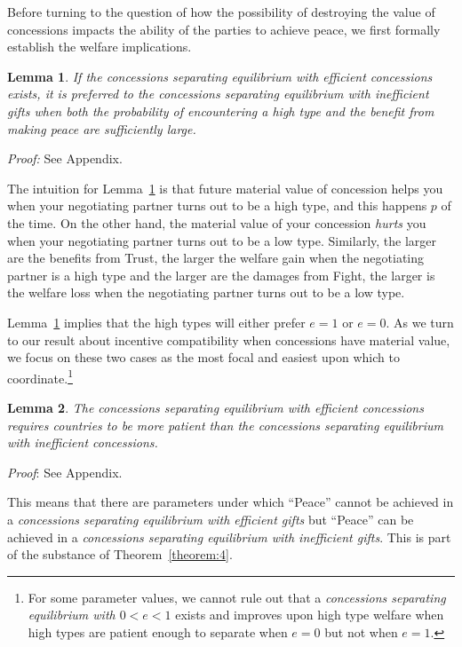 \documentclass[12pt, letterpaper]{article}
\newtheorem{lemma}{Lemma}
\begin{document}
Before turning to the question of how the possibility of destroying the value of concessions impacts the ability of the parties to achieve peace, we first formally establish the welfare implications.

\begin{lemma}
	If the \emph{concessions separating equilibrium with efficient concessions} exists, it is preferred to the \emph{concessions separating equilibrium with inefficient gifts} when both the probability of encountering a high type and the benefit from making peace are sufficiently large.
	\label{lemma:efficiency}
\end{lemma}
\emph{Proof:} See Appendix.

The intuition for Lemma~\ref{lemma:efficiency} is that future material value of concession helps you when your negotiating partner turns out to be a high type, and this happens $p$ of the time. On the other hand, the material value of your concession \emph{hurts} you when your negotiating partner turns out to be a low type. Similarly, the larger are the benefits from Trust, the larger the welfare gain when the negotiating partner is a high type and the larger are the damages from Fight, the larger is the welfare loss when the negotiating partner turns out to be a low type.

Lemma~\ref{lemma:efficiency} implies that the high types will either prefer $e=1$ or $e=0$. As we turn to our result about incentive compatibility when concessions have material value, we focus on these two cases as the most focal and easiest upon which to coordinate.\footnote{For some parameter values, we cannot rule out that a \emph{concessions separating equilibrium with $0<e<1$} exists and improves upon high type welfare when high types are patient enough to separate when $e=0$ but not when $e=1$.} %

\begin{lemma}
	The \emph{concessions separating equilibrium with efficient concessions} requires countries to be more patient than the \emph{concessions separating equilibrium with inefficient concessions}. 
	\label{lemma:e-patient}
\end{lemma}
\emph{Proof}: See Appendix.

This means that there are parameters under which ``Peace'' cannot be achieved in a \emph{concessions separating equilibrium with efficient gifts} but ``Peace'' can be achieved in a \emph{concessions separating equilibrium with inefficient gifts}. This is part of the substance of Theorem~\ref{theorem:4}. 
\end{document}
